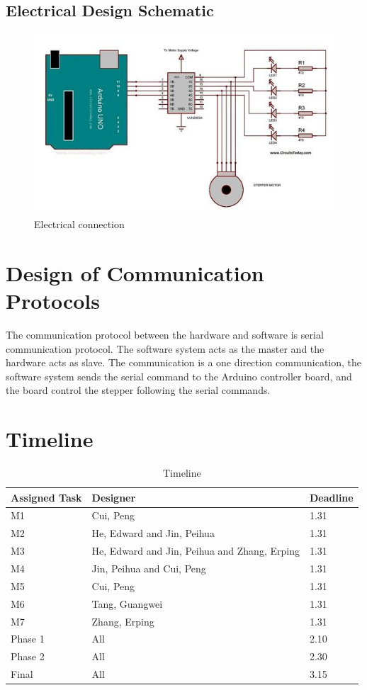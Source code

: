 \documentclass[12pt, titlepage]{article}
\begin{document}
\subsection{Electrical Design Schematic}
\begin{figure}[H]
\centering
\includegraphics[width=\textwidth]{board-motor}
\caption{Electrical connection}
\end{figure}






\section{Design of Communication Protocols}


The communication protocol between the hardware and software is serial communication protocol. The software system acts as the master and the hardware acts as slave. The communication is a one direction communication, the software system sends the serial command to the Arduino controller board, and the board control the stepper following the serial commands.
\section{Timeline}
\begin{table}[H]
\begin{tabularx}{\textwidth}{XXX}
  \toprule  
  \textbf{Assigned Task} & \textbf{Designer} & \textbf{Deadline}\\
  \midrule 
  M1 & Cui, Peng & 1.31\\
  M2 & He, Edward and Jin, Peihua & 1.31\\
  M3 & He, Edward and Jin, Peihua and Zhang, Erping & 1.31\\
  M4 & Jin, Peihua and Cui, Peng & 1.31\\
  M5 & Cui, Peng & 1.31\\
  M6 & Tang, Guangwei & 1.31\\
  M7 & Zhang, Erping & 1.31\\
  Phase 1 & All & 2.10\\
  Phase 2 & All & 2.30\\
  Final & All & 3.15\\
  \bottomrule
\end{tabularx}
\caption{Timeline}
\label{TableTL}
\end{table}
\end{document}
